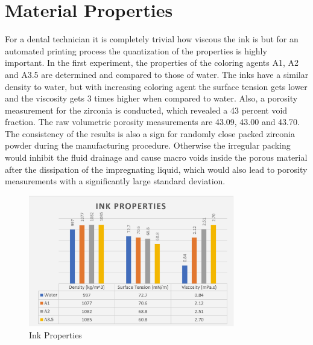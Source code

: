 \section{Material Properties}
For a dental technician it is completely trivial how viscous the ink is but for an automated printing  process the quantization of the properties is highly important. In the first experiment, the properties of the coloring agents A1, A2 and A3.5 are determined and compared to those of water. The inks have a similar density to water, but with increasing coloring agent the surface tension gets lower and the viscosity gets 3 times higher when compared to water. Also, a porosity measurement for the zirconia is conducted, which revealed a 43 percent void fraction. The raw volumetric porosity measurements are 43.09,	43.00 and 43.70. The consistency of the results is also a sign for randomly close packed zirconia powder during the manufacturing procedure. Otherwise the irregular packing would inhibit the fluid drainage and cause macro voids inside the porous material after the dissipation of the impregnating liquid, which would also lead to porosity measurements with a significantly large standard deviation. 

\bigskip

\begin{figure}[H]
	\centering
	\includegraphics[width=0.8\textwidth]{grafiken/InkProps.jpg}
	\caption{Ink Properties}
	\label{fig:InkProps}
\end{figure} 

\bigskip

